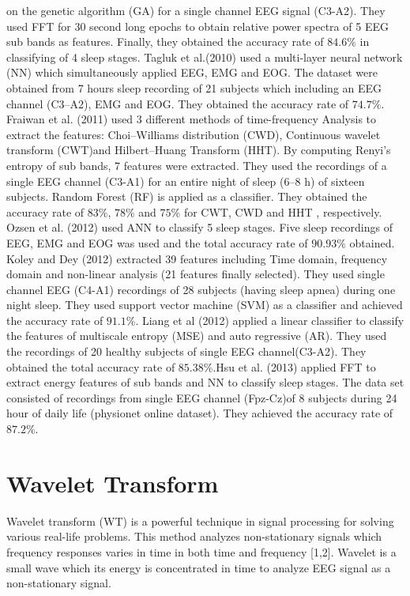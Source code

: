 \documentclass[a4paper, 11pt]{article} %
\begin{document}
on the genetic algorithm (GA) for a single channel EEG signal (C3-A2). They used FFT for 30 second long epochs to obtain  relative power spectra of 5 EEG sub bands as features. Finally, they obtained the accuracy rate of $84.6\%$ in classifying of 4 sleep stages.  Tagluk et al.(2010) used a multi-layer neural network (NN) which simultaneously applied EEG, EMG and EOG. The dataset were obtained from 7 hours sleep recording of 21 subjects which including an EEG channel (C3–A2), EMG and EOG. They obtained the accuracy rate of $74.7\%$. Fraiwan et al. (2011) used 3 different methods of time-frequency Analysis to extract the features: Choi–Williams distribution (CWD), Continuous wavelet transform (CWT)and Hilbert–Huang Transform (HHT). By computing Renyi’s entropy of sub bands, 7 features were extracted. They used the recordings of a single EEG channel (C3-A1) for an entire night of sleep (6–8 h) of sixteen subjects. Random Forest (RF) is applied as a classifier. They obtained the accuracy rate of $83\%$, $78\%$ and $75\%$ for CWT, CWD and HHT , respectively. Ozsen et al. (2012) used ANN to classify 5 sleep stages. Five sleep recordings of EEG, EMG and EOG was used and the total accuracy rate of $90.93\%$ obtained. Koley and Dey (2012) extracted 39 features including Time domain, frequency domain and non-linear analysis (21 features finally selected). They used single channel EEG (C4-A1) recordings of 28 subjects (having sleep apnea) during one night sleep. They used support vector machine (SVM) as a classifier and achieved the accuracy rate of $91.1\%$. Liang et al (2012) applied a linear classifier to classify the features of multiscale entropy (MSE) and auto regressive (AR). They used the recordings of 20 healthy subjects of single EEG channel(C3-A2). They obtained the total accuracy rate of $85.38\%$.Hsu et al. (2013) applied FFT to extract energy features of sub bands and NN to classify sleep stages. The data set consisted of recordings from single EEG channel (Fpz-Cz)of 8 subjects during 24 hour of daily life (physionet online dataset). They achieved the accuracy rate of $87.2\%$. 






\section*{Wavelet Transform}

Wavelet transform (WT) is a powerful technique in signal processing for solving various real-life problems. This method analyzes non-stationary signals which frequency responses varies in time in both time and frequency [1,2]. Wavelet is a small wave which its energy is concentrated in time to analyze EEG signal as a non-stationary signal.
\end{document}
